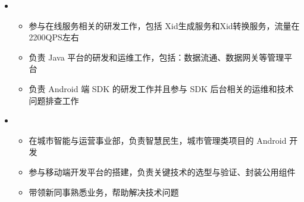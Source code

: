   \begin{itemize}[leftmargin=*]
    \item
      {\small
      \begin{itemize}
        \item 参与在线服务相关的研发工作，包括 Xid生成服务和Xid转换服务，流量在2200QPS左右
        \item 负责 Java 平台的研发和运维工作，包括：数据流通、数据网关等管理平台
        \item 负责 Android 端 SDK 的研发工作并且参与 SDK 后台相关的运维和技术问题排查工作
      \end{itemize}
      }

    \item
      {\small
      \begin{itemize}
    \item 在城市智能与运营事业部，负责智慧民生，城市管理类项目的 Android 开发
    \item 参与移动端开发平台的搭建，负责关键技术的选型与验证、封装公用组件
    \item 带领新同事熟悉业务，帮助解决技术问题
      \end{itemize}
      }

  \end{itemize}